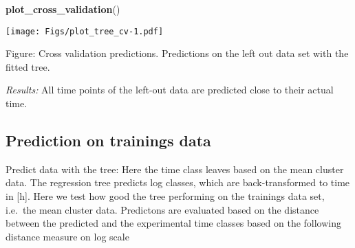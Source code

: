 \documentclass[]{article}
\newenvironment{Shaded}{\begin{snugshade}}{\end{snugshade}}
\newcommand{\KeywordTok}[1]{\textcolor[rgb]{0.13,0.29,0.53}{\textbf{{#1}}}}
\newcommand{\DataTypeTok}[1]{\textcolor[rgb]{0.13,0.29,0.53}{{#1}}}
\newcommand{\DecValTok}[1]{\textcolor[rgb]{0.00,0.00,0.81}{{#1}}}
\newcommand{\FloatTok}[1]{\textcolor[rgb]{0.00,0.00,0.81}{{#1}}}
\newcommand{\StringTok}[1]{\textcolor[rgb]{0.31,0.60,0.02}{{#1}}}
\newcommand{\NormalTok}[1]{{#1}}
\begin{document}
\begin{Shaded}
\end{Shaded}

\begin{Shaded}
\begin{Highlighting}[]
\KeywordTok{plot_cross_validation}\NormalTok{()}
\end{Highlighting}
\end{Shaded}

\texttt{[image: Figs/plot\_tree\_cv-1.pdf]}

Figure: Cross validation predictions. Predictions on the left out data
set with the fitted tree.

\emph{Results:} All time points of the left-out data are predicted close
to their actual time.

\subsection{Prediction on trainings
data}\label{prediction-on-trainings-data}

Predict data with the tree: Here the time class leaves based on the mean
cluster data. The regression tree predicts log classes, which are
back-transformed to time in {[}h{]}. Here we test how good the tree
performing on the trainings data set, i.e.~the mean cluster data.
Predictons are evaluated based on the distance between the predicted and
the experimental time classes based on the following distance measure on
log scale
\end{document}

